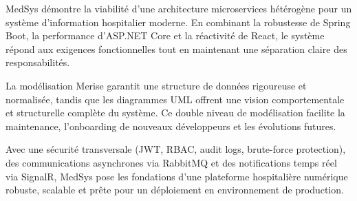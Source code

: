\begin{tcolorbox}[enhanced, colback=medsyslight, colframe=medsysdark,
  fonttitle=\bfseries, title={MedSys -- Une architecture prête pour la production},
  leftrule=5pt, arc=4pt]
MedSys démontre la viabilité d'une architecture microservices hétérogène pour
un système d'information hospitalier moderne. En combinant la robustesse de
Spring Boot, la performance d'ASP.NET Core et la réactivité de React, le
système répond aux exigences fonctionnelles tout en maintenant une séparation
claire des responsabilités.

\vspace{0.4cm}
La modélisation Merise garantit une structure de données rigoureuse et normalisée,
tandis que les diagrammes UML offrent une vision comportementale et structurelle
complète du système. Ce double niveau de modélisation facilite la maintenance,
l'onboarding de nouveaux développeurs et les évolutions futures.

\vspace{0.4cm}
Avec une sécurité transversale (JWT, RBAC, audit logs, brute-force protection),
des communications asynchrones via RabbitMQ et des notifications temps réel
via SignalR, MedSys pose les fondations d'une plateforme hospitalière numérique
robuste, scalable et prête pour un déploiement en environnement de production.
\end{tcolorbox}


